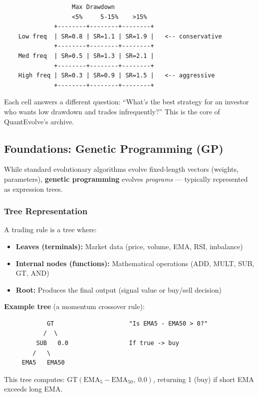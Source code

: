 \documentclass[11pt,a4paper]{article}
\begin{document}
\begin{verbatim}
                   Max Drawdown
                   <5%     5-15%    >15%
              +--------+--------+--------+
    Low freq  | SR=0.8 | SR=1.1 | SR=1.9 |   <-- conservative
              +--------+--------+--------+
    Med freq  | SR=0.5 | SR=1.3 | SR=2.1 |
              +--------+--------+--------+
    High freq | SR=0.3 | SR=0.9 | SR=1.5 |   <-- aggressive
              +--------+--------+--------+
\end{verbatim}

Each cell answers a different question: ``What's the best strategy for an investor who wants low drawdown and trades infrequently?'' This is the core of QuantEvolve's archive.


\subsection{Foundations: Genetic Programming (GP)}

While standard evolutionary algorithms evolve fixed-length vectors (weights, parameters), \textbf{genetic programming} evolves \textit{programs} --- typically represented as expression trees.

\subsubsection{Tree Representation}

A trading rule is a tree where:
\begin{itemize}
    \item \textbf{Leaves (terminals):} Market data (price, volume, EMA, RSI, imbalance)
    \item \textbf{Internal nodes (functions):} Mathematical operations (ADD, MULT, SUB, GT, AND)
    \item \textbf{Root:} Produces the final output (signal value or buy/sell decision)
\end{itemize}

\textbf{Example tree} (a momentum crossover rule):

\begin{verbatim}
            GT                     "Is EMA5 - EMA50 > 0?"
           /  \
         SUB   0.0                 If true -> buy
        /   \
     EMA5   EMA50
\end{verbatim}

This tree computes: $\text{GT}(\text{EMA}_5 - \text{EMA}_{50}, \; 0.0)$, returning 1 (buy) if short EMA exceeds long EMA.
\end{document}
